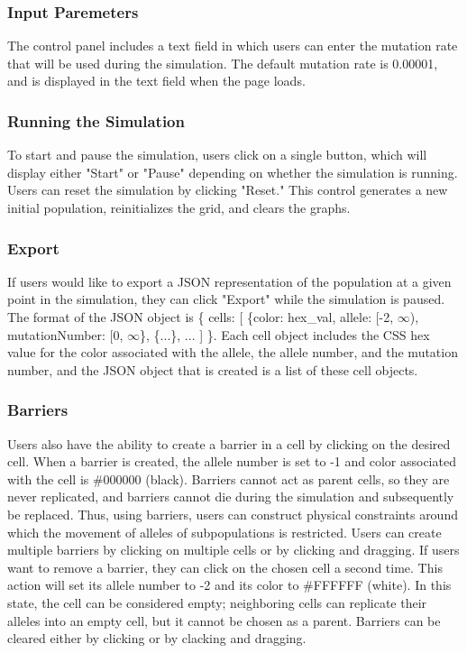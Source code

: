 \documentclass[12pt]{article}
\begin{document}
\begin{spacing}{1.5}
\subsubsection{Input Paremeters}
The control panel includes a text field in which users can enter the mutation rate that will be used during the simulation. The default mutation rate is 0.00001, and is displayed in the text field when the page loads.
\subsubsection{Running the Simulation}
To start and pause the simulation, users click on a single button, which will display either "Start" or "Pause" depending on whether the simulation is running. Users can reset the simulation by clicking "Reset." This control generates a new initial population, reinitializes the grid, and clears the graphs.
\subsubsection{Export}
If users would like to export a JSON representation of the population at a given point in the simulation, they can click "Export" while the simulation is paused. The format of the JSON object is \{ cells: [ \{color: hex\_val, allele: [-2, $\infty$), mutationNumber: [0, $\infty$\}, \{...\}, ... ] \}. Each cell object includes the CSS hex value for the color associated with the allele, the allele number, and the mutation number, and the JSON object that is created is a list of these cell objects.
\subsubsection{Barriers}
Users also have the ability to create a barrier in a cell by clicking on the desired cell. When a barrier is created, the allele number is set to -1 and color associated with the cell is \#000000 (black). Barriers cannot act as parent cells, so they are never replicated, and barriers cannot die during the simulation and subsequently be replaced. Thus, using barriers, users can construct physical constraints around which the movement of alleles of subpopulations is restricted. Users can create multiple barriers by clicking on multiple cells or by clicking and dragging. If users want to remove a barrier, they can click on the chosen cell a second time. This action will set its allele number to -2 and its color to \#FFFFFF (white). In this state, the cell can be considered empty; neighboring cells can replicate their alleles into an empty cell, but it cannot be chosen as a parent. Barriers can be cleared either by clicking or by clacking and dragging.

\end{spacing}
\end{document}
